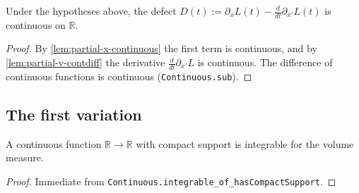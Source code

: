 \begin{lemma}
    \label{lem:el-defect-continuous}
    \leanok
    Under the hypotheses above, the defect
    $D(t) := \partial_x L(t) - \frac{d}{dt}\partial_{x'} L(t)$ is continuous on
    $\mathbb{R}$.
\end{lemma}
\begin{proof}
    By \cref{lem:partial-x-continuous} the first term is continuous, and by
    \cref{lem:partial-v-contdiff} the derivative $\frac{d}{dt}\partial_{x'} L$
    is continuous. The difference of continuous functions is continuous
    (\texttt{Continuous.sub}).
\end{proof}

\subsection{The first variation}

\begin{lemma}
    \label{lem:continuous-compact-support-integrable}
    \leanok
    A continuous function $\mathbb{R} \to \mathbb{R}$ with compact support is
    integrable for the volume measure.
\end{lemma}
\begin{proof}
    Immediate from \texttt{Continuous.integrable\_of\_hasCompactSupport}.
\end{proof}


